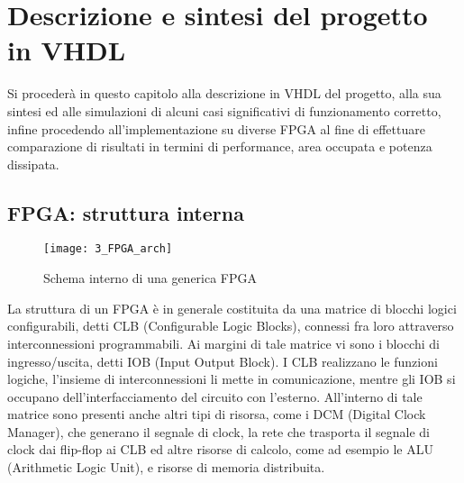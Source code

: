 \chapter{Descrizione e sintesi del progetto in VHDL}
Si procederà in questo capitolo alla descrizione in VHDL del progetto, alla sua sintesi ed alle simulazioni di alcuni casi significativi di funzionamento corretto, infine procedendo all'implementazione su diverse FPGA al fine di effettuare comparazione di risultati in termini di performance, area occupata e potenza dissipata.

\section{FPGA: struttura interna}
\newpage

\begin{figure}[H]
	\centering
	\texttt{[image: 3\_FPGA\_arch]}
	\caption{Schema interno di una generica FPGA}
	\label{fig:fpga_architecture}
\end{figure}
La struttura di un FPGA è in generale costituita da una matrice di blocchi logici configurabili, detti CLB (Configurable Logic Blocks), connessi fra loro attraverso interconnessioni programmabili. Ai margini di tale matrice vi sono i blocchi di ingresso/uscita, detti IOB (Input Output Block). I CLB realizzano le funzioni logiche, l'insieme di interconnessioni li mette in comunicazione, mentre gli IOB si occupano dell'interfacciamento del circuito con l'esterno. All'interno di tale matrice sono presenti anche altri tipi di risorsa, come i DCM (Digital Clock Manager), che generano il segnale di clock, la rete che trasporta il segnale di clock dai flip-flop ai CLB ed altre risorse di calcolo, come ad esempio le ALU (Arithmetic Logic Unit), e risorse di memoria distribuita.

